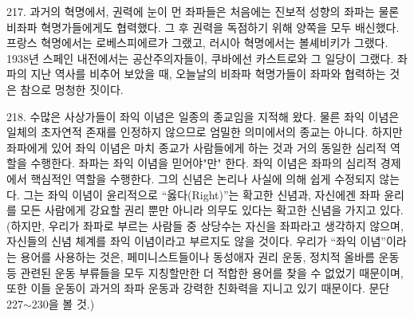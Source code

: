 \documentclass[11pt,a4paper]{article}
\begin{document}
\begin{multicols}{2}
217. 과거의 혁명에서, 권력에 눈이 먼 좌파들은 처음에는 진보적 성향의 좌파는 물론 비좌파  혁명가들에게도 협력했다. 그 후 권력을 독점하기 위해 양쪽을 모두 배신했다. 프랑스 혁명에서는  로베스피에르가 그랬고, 러시아 혁명에서는 볼셰비키가 그랬다. 1938년 스페인 내전에서는  공산주의자들이, 쿠바에선 카스트로와 그 일당이 그랬다. 좌파의 지난 역사를 비추어 보았을 때, 오늘날의 비좌파 혁명가들이 좌파와 협력하는 것은 참으로 멍청한 짓이다.


218. 수많은 사상가들이 좌익 이념은 일종의 종교임을 지적해 왔다. 물른 좌익 이념은 일체의 초자연적  존재를 인정하지 않으므로 엄밀한 의미에서의 종교는 아니다. 하지만 좌파에게 있어 좌익 이념은 마치  종교가 사람들에게 하는 것과 거의 동일한 심리적 역할을 수행한다. 좌파는 좌익 이념을 믿어야"만" 한다.  좌익 이념은 좌파의 심리적 경제에서 핵심적인 역할을 수행한다. 그의 신념은 논리나 사실에 의해 쉽게  수정되지 않는다. 그는 좌익 이념이 윤리적으로 “옳다(Right)”는 확고한 신념과, 자신에겐 좌파 윤리를  모든 사람에게 강요할 권리 뿐만 아니라 의무도 있다는 확고한 신념을 가지고 있다. (하지만, 우리가  좌파로 부르는 사람들 중 상당수는 자신을 좌파라고 생각하지 않으며, 자신들의 신념 체계를 좌익 이념이라고 부르지도 않을 것이다. 우리가 “좌익 이념”이라는 용어를 사용하는 것은, 페미니스트들이나  동성애자 권리 운동, 정치적 올바름 운동 등 관련된 운동 부류들을 모두 지칭할만한 더 적합한 용어를  찾을 수 없었기 때문이며, 또한 이들 운동이 과거의 좌파 운동과 강력한 친화력을 지니고 있기 때문이다.  문단 227${\sim}$230을 볼 것.) 



\end{multicols}
\end{document}
